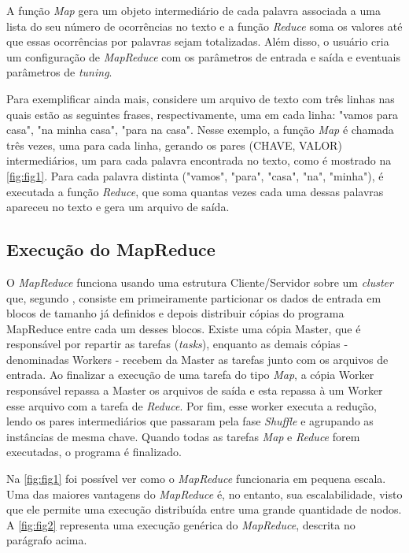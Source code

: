 \newpage
A função \textit{Map} gera um objeto intermediário de cada palavra associada a uma lista do seu número de ocorrências no texto e a função \textit{Reduce} soma os valores até que essas ocorrências por palavras sejam totalizadas. Além disso, o usuário cria um configuração de \textit{MapReduce} com os parâmetros de entrada e saída e eventuais parâmetros de \textit{tuning}.

Para exemplificar ainda mais, considere um arquivo de texto com três linhas nas quais estão as seguintes frases, respectivamente, uma em cada linha: "vamos para casa", "na minha casa", "para na casa". Nesse exemplo, a função \textit{Map} é chamada três vezes, uma para cada linha, gerando os pares (CHAVE, VALOR) intermediários, um para cada palavra encontrada no texto, como é mostrado na \autoref{fig:fig1}. Para cada palavra distinta ("vamos", "para", "casa", "na", "minha"), é executada a função \textit{Reduce}, que soma quantas vezes cada uma dessas palavras apareceu no texto e gera um arquivo de saída.


\subsection{Execução do MapReduce}\label{ssec:execucaomapreduce}

O \textit{MapReduce} funciona usando uma estrutura Cliente/Servidor sobre um \textit{cluster} que, segundo \textcite{MapReduce08}, consiste em primeiramente particionar os dados de entrada em blocos de tamanho já definidos e depois distribuir cópias do programa MapReduce entre cada um desses blocos. Existe uma cópia Master, que é responsável por repartir as tarefas (\textit{tasks}), enquanto as demais cópias - denominadas Workers - recebem da Master as tarefas junto com os arquivos de entrada. Ao finalizar a execução de uma tarefa do tipo \textit{Map}, a cópia Worker responsável repassa a Master os arquivos de saída e esta repassa à um Worker esse arquivo com a tarefa de \textit{Reduce}. Por fim, esse worker executa a redução, lendo os pares intermediários que passaram pela fase \textit{Shuffle} e agrupando as instâncias de mesma chave. Quando todas as tarefas \textit{Map} e \textit{Reduce} forem executadas, o programa é finalizado.

Na \autoref{fig:fig1} foi possível ver como o \textit{MapReduce} funcionaria em pequena escala. Uma das maiores vantagens do \textit{MapReduce} é, no entanto, sua escalabilidade, visto que ele permite uma execução distribuída entre uma grande quantidade de nodos. A \autoref{fig:fig2}  representa uma execução genérica do \textit{MapReduce}, descrita no parágrafo acima.

